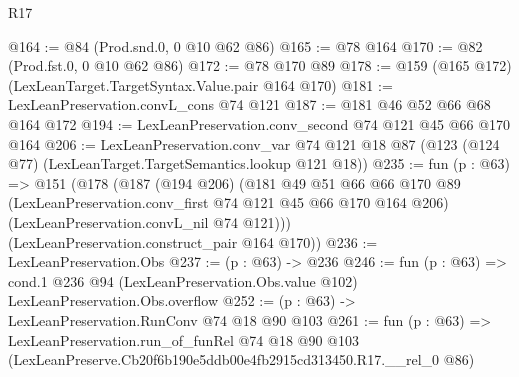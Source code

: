 \begin{lexlean}{R17}
\begin{coremodule}
@164 := @84 (Prod.snd.{0, 0} @10 @62 @86)
@165 := @78 @164
@170 := @82 (Prod.fst.{0, 0} @10 @62 @86)
@172 := @78 @170 @89
@178 := @159 (@165 @172) (LexLeanTarget.TargetSyntax.Value.pair @164 @170)
@181 := LexLeanPreservation.convL_cons @74 @121
@187 := @181 @46 @52 @66 @68 @164 @172
@194 := LexLeanPreservation.conv_second @74 @121 @45 @66 @170 @164
@206 := LexLeanPreservation.conv_var
    @74
    @121
    @18
    @87
    (@123 (@124 @77) (LexLeanTarget.TargetSemantics.lookup @121 @18))
@235 := fun (p : @63) =>
  @151
    (@178
      (@187
        (@194 @206)
        (@181
          @49
          @51
          @66
          @66
          @170
          @89
          (LexLeanPreservation.conv_first @74 @121 @45 @66 @170 @164 @206)
          (LexLeanPreservation.convL_nil @74 @121)))
      (LexLeanPreservation.construct_pair @164 @170))
@236 := LexLeanPreservation.Obs
@237 := (p : @63) -> @236
@246 := fun (p : @63) =>
  cond.{1} @236 @94 (LexLeanPreservation.Obs.value @102) LexLeanPreservation.Obs.overflow
@252 := (p : @63) -> LexLeanPreservation.RunConv @74 @18 @90 @103
@261 := fun (p : @63) =>
  LexLeanPreservation.run_of_funRel
    @74
    @18
    @90
    @103
    (LexLeanPreserve.Cb20f6b190e5ddb00e4fb2915cd313450.R17.__rel_0 @86)
\end{coremodule}
\end{lexlean}
